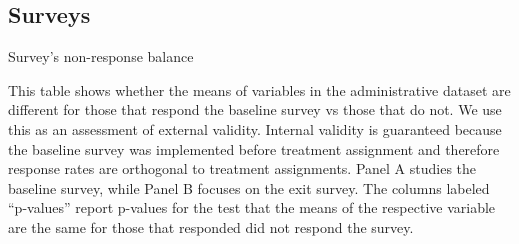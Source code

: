 \documentclass[oneside,11pt]{article}
\begin{document}



\subsection{Surveys}


\begin{table}[H]
\caption{Survey's non-response balance}
\label{balance_response}
\begin{center}
\scriptsize{}
\end{center}
 \scriptsize This table shows whether the means of variables in the administrative dataset are different for those that respond the baseline survey vs those that do not. We use this as an assessment of external validity. Internal validity is guaranteed because the baseline survey was implemented before treatment assignment and therefore response rates are orthogonal to treatment assignments. Panel A studies the baseline survey, while Panel B focuses on the exit survey. The columns labeled ``p-values'' report p-values for the test that the means of the respective variable are the same for those that responded did not respond the survey.
\end{table}


\end{document}
